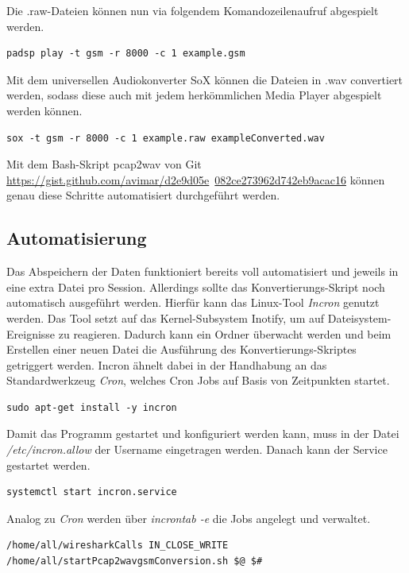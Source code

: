 Die .raw-Dateien können nun via folgendem Komandozeilenaufruf abgespielt werden.
\begin{lstlisting}
padsp play -t gsm -r 8000 -c 1 example.gsm
\end{lstlisting}

Mit dem universellen Audiokonverter SoX können die Dateien in .wav convertiert werden, sodass diese auch mit jedem herkömmlichen Media Player abgespielt werden können.
\begin{lstlisting}
sox -t gsm -r 8000 -c 1 example.raw exampleConverted.wav
\end{lstlisting}

Mit dem Bash-Skript pcap2wav von Git \url{https://gist.github.com/avimar/d2e9d05e}\
\url{082ce273962d742eb9acac16} können genau diese Schritte automatisiert durchgeführt werden.


\subsection{Automatisierung}\label{automatisierung}

Das Abspeichern der Daten funktioniert bereits voll automatisiert und jeweils in eine extra Datei pro Session. Allerdings sollte das Konvertierungs-Skript noch automatisch ausgeführt werden. Hierfür kann das Linux-Tool \textit{Incron} genutzt werden. Das Tool setzt auf das Kernel-Subsystem Inotify, um auf Dateisystem-Ereignisse zu reagieren. Dadurch kann ein Ordner überwacht werden und beim Erstellen einer neuen Datei die Ausführung des Konvertierungs-Skriptes getriggert werden. Incron ähnelt dabei in der Handhabung an das Standardwerkzeug \textit{Cron}, welches Cron Jobs auf Basis von Zeitpunkten startet.


\begin{lstlisting}
sudo apt-get install -y incron
\end{lstlisting}

Damit das Programm gestartet und konfiguriert werden kann, muss in der Datei \textit{/etc/incron.allow} der Username eingetragen werden. Danach kann der Service gestartet werden.

\begin{lstlisting}
systemctl start incron.service
\end{lstlisting}

Analog zu \textit{Cron} werden über \textit{incrontab -e} die Jobs angelegt und verwaltet.
\begin{lstlisting}
/home/all/wiresharkCalls IN_CLOSE_WRITE /home/all/startPcap2wavgsmConversion.sh $@ $#
\end{lstlisting}


